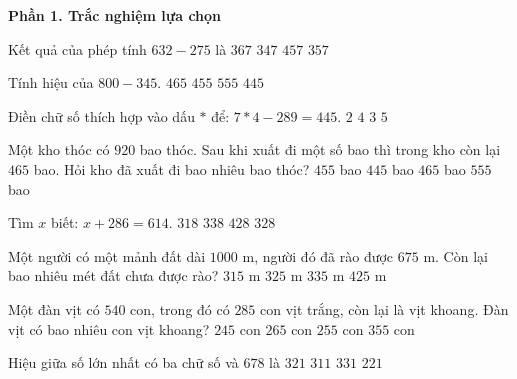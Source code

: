\textbf{Phần 1. Trắc nghiệm lựa chọn}

\begin{ex} %
Kết quả của phép tính $632 - 275$ là
\choice
{$367$}
{$347$}
{$457$}
{\True $357$}
\end{ex}

\begin{ex} %
Tính hiệu của $800 - 345$.
\choice
{$465$}
{\True $455$}
{$555$}
{$445$}
\end{ex}

\begin{ex} %
Điền chữ số thích hợp vào dấu $*$ để: $7*4 - 289 = 445$.
\choice
{$2$}
{$4$}
{\True $3$}
{$5$}
\end{ex}

\begin{ex} %
Một kho thóc có $920$ bao thóc. Sau khi xuất đi một số bao thì trong kho còn lại $465$ bao. Hỏi kho đã xuất đi bao nhiêu bao thóc?
\choice
{\True $455$ bao}
{$445$ bao}
{$465$ bao}
{$555$ bao}
\end{ex}

\begin{ex} %
Tìm $x$ biết: $x + 286 = 614$.
\choice
{$318$}
{$338$}
{$428$}
{\True $328$}
\end{ex}

\begin{ex} %
Một người có một mảnh đất dài $1 000\text{ m}$, người đó đã rào được $675\text{ m}$. Còn lại bao nhiêu mét đất chưa được rào?
\choice
{$315\text{ m}$}
{\True $325\text{ m}$}
{$335\text{ m}$}
{$425\text{ m}$}
\end{ex}

\begin{ex} %
Một đàn vịt có $540$ con, trong đó có $285$ con vịt trắng, còn lại là vịt khoang. Đàn vịt có bao nhiêu con vịt khoang?
\choice
{$245$ con}
{$265$ con}
{\True $255$ con}
{$355$ con}
\end{ex}

\begin{ex} %
Hiệu giữa số lớn nhất có ba chữ số và $678$ là
\choice
{\True $321$}
{$311$}
{$331$}
{$221$}
\end{ex}

